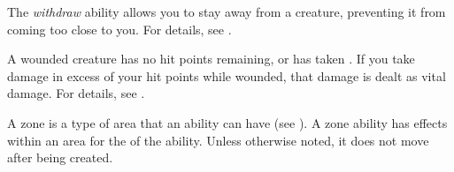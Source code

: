  The \textit{withdraw} ability allows you to stay away from a creature, preventing it from coming too close to you.
For details, see .

 A wounded creature has no hit points remaining, or has taken .
If you take damage in excess of your hit points while wounded, that damage is dealt as vital damage.
For details, see .

 A zone is a type of area that an ability can have (see ).
A zone ability has effects within an area for the  of the ability.
Unless otherwise noted, it does not move after being created.
